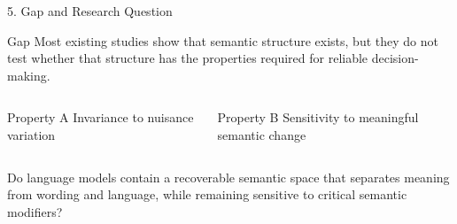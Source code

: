 \documentclass[aspectratio=169,11pt]{beamer}
\begin{document}
\begin{frame}{5. Gap and Research Question}
  \begin{block}{Gap}
  Most existing studies show that semantic structure exists, but they do not test whether that structure has the properties required for reliable decision-making.
  \end{block}

  \vspace{0.35cm}
  \begin{columns}[T,totalwidth=\textwidth]
      \begin{block}{Property A}
      Invariance to nuisance variation
      \end{block}
      \begin{block}{Property B}
      Sensitivity to meaningful semantic change
      \end{block}
  \end{columns}

  \vspace{0.35cm}
  {\large\color{SafetyBlue}Do language models contain a recoverable semantic space that separates meaning from wording and language, while remaining sensitive to critical semantic modifiers?}
\end{frame}
\end{document}
